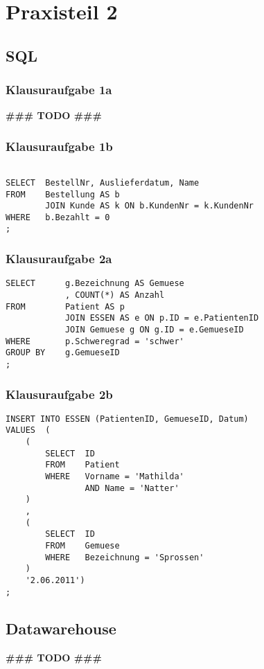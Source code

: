 
\section{Praxisteil 2}

\subsection{SQL}

\subsubsection{Klausuraufgabe 1a}
\textbf{\#\#\# TODO \#\#\#}

\subsubsection{Klausuraufgabe 1b}

\lstset{language=SQL}
\begin{lstlisting}[frame=L]

SELECT  BestellNr, Auslieferdatum, Name
FROM    Bestellung AS b
        JOIN Kunde AS k ON b.KundenNr = k.KundenNr
WHERE   b.Bezahlt = 0
;

\end{lstlisting}


\subsubsection{Klausuraufgabe 2a}

\lstset{language=SQL,numbers=left,numberstyle=\tiny}
\begin{lstlisting}[frame=L]
SELECT      g.Bezeichnung AS Gemuese
            , COUNT(*) AS Anzahl
FROM        Patient AS p
            JOIN ESSEN AS e ON p.ID = e.PatientenID
            JOIN Gemuese g ON g.ID = e.GemueseID
WHERE       p.Schweregrad = 'schwer'
GROUP BY    g.GemueseID
;

\end{lstlisting}

\subsubsection{Klausuraufgabe 2b}

\lstset{language=SQL}
\begin{lstlisting}[frame=L]
INSERT INTO ESSEN (PatientenID, GemueseID, Datum)
VALUES  (
    (
        SELECT  ID
        FROM    Patient
        WHERE   Vorname = 'Mathilda'
                AND Name = 'Natter'
    )
    ,
    (
        SELECT  ID
        FROM    Gemuese
        WHERE   Bezeichnung = 'Sprossen'
    )
    '2.06.2011')
;
\end{lstlisting}


\subsection{Datawarehouse}
\textbf{\#\#\# TODO \#\#\#}





